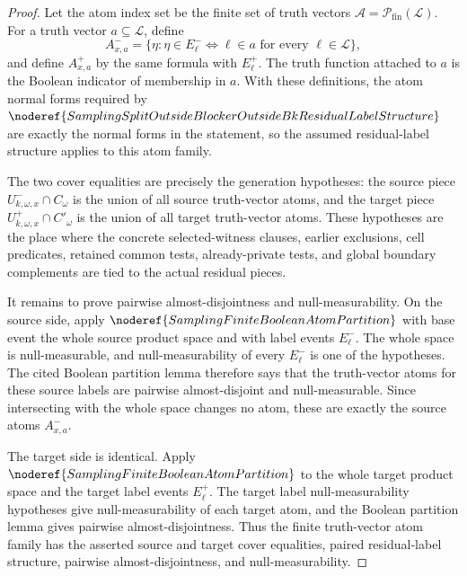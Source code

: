 \begin{proof}
Let the atom index set be the finite set of truth vectors
\(\mathcal A=\mathcal P_{\mathrm{fin}}(\mathcal L)\).  For a truth vector
\(a\subseteq\mathcal L\), define
\[
  A^-_{x,a}
  =
  \{\eta:\eta\in E^-_\ell\Longleftrightarrow \ell\in a
       \text{ for every }\ell\in\mathcal L\},
\]
and define \(A^+_{x,a}\) by the same formula with \(E^+_\ell\).  The truth
function attached to \(a\) is the Boolean indicator of membership in \(a\).
With these definitions, the atom normal forms required by
\(\noderef{SamplingSplitOutsideBlockerOutsideBkResidualLabelStructure}\) are
exactly the normal forms in the statement, so the assumed residual-label
structure applies to this atom family.

The two cover equalities are precisely the generation hypotheses: the source
piece \(U^-_{k,\omega,x}\cap C_\omega\) is the union of all source
truth-vector atoms, and the target piece \(U^+_{k,\omega,x}\cap C'_\omega\)
is the union of all target truth-vector atoms.  These hypotheses are the
place where the concrete selected-witness clauses, earlier exclusions, cell
predicates, retained common tests, already-private tests, and global
boundary complements are tied to the actual residual pieces.

It remains to prove pairwise almost-disjointness and null-measurability.  On
the source side, apply
\(\noderef{SamplingFiniteBooleanAtomPartition}\) with base event the whole
source product space and with label events \(E^-_\ell\).  The whole space is
null-measurable, and null-measurability of every \(E^-_\ell\) is one of the
hypotheses.  The cited Boolean partition lemma therefore says that the
truth-vector atoms for these source labels are pairwise almost-disjoint and
null-measurable.  Since intersecting with the whole space changes no atom,
these are exactly the source atoms \(A^-_{x,a}\).

The target side is identical.  Apply
\(\noderef{SamplingFiniteBooleanAtomPartition}\) to the whole target product
space and the target label events \(E^+_\ell\).  The target label
null-measurability hypotheses give null-measurability of each target atom,
and the Boolean partition lemma gives pairwise almost-disjointness.  Thus
the finite truth-vector atom family has the asserted source and target cover
equalities, paired residual-label structure, pairwise almost-disjointness,
and null-measurability.
\end{proof}
